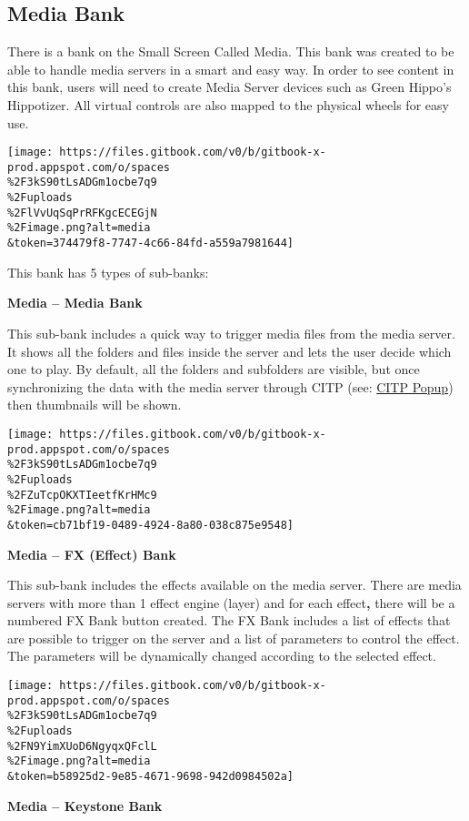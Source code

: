 \documentclass[
]{article}
\begin{document}
\hypertarget{media-bank}{%
\subsection{Media Bank}\label{media-bank}}

There is a bank on the Small Screen Called Media. This bank was created to be able to handle media servers in a smart and easy way. In order to see content in this bank, users will need to create Media Server devices such as Green Hippo's Hippotizer. All virtual controls are also mapped to the physical wheels for easy use.

\texttt{[image: https://files.gitbook.com/v0/b/gitbook-x-prod.appspot.com/o/spaces\\\%2F3kS90tLsADGm1ocbe7q9\\\%2Fuploads\\\%2FlVvUqSqPrRFKgcECEGjN\\\%2Fimage.png?alt=media\\\&token=374479f8-7747-4c66-84fd-a559a7981644]}

This bank has 5 types of sub-banks:

\textbf{Media -- Media Bank}

This sub-bank includes a quick way to trigger media files from the media server. It shows all the folders and files inside the server and lets the user decide which one to play. By default, all the folders and subfolders are visible, but once synchronizing the data with the media server through CITP (see: \href{https://vibemanual.compulite.com/connecting-to-external-devices.html\#citp}{CITP Popup}) then thumbnails will be shown.

\texttt{[image: https://files.gitbook.com/v0/b/gitbook-x-prod.appspot.com/o/spaces\\\%2F3kS90tLsADGm1ocbe7q9\\\%2Fuploads\\\%2FZuTcpOKXTIeetfKrHMc9\\\%2Fimage.png?alt=media\\\&token=cb71bf19-0489-4924-8a80-038c875e9548]}

\textbf{Media -- FX (Effect) Bank}

This sub-bank includes the effects available on the media server. There are media servers with more than 1 effect engine (layer) and for each effect\textbf{,} there will be a numbered FX Bank button created. The FX Bank includes a list of effects that are possible to trigger on the server and a list of parameters to control the effect. The parameters will be dynamically changed according to the selected effect.

\texttt{[image: https://files.gitbook.com/v0/b/gitbook-x-prod.appspot.com/o/spaces\\\%2F3kS90tLsADGm1ocbe7q9\\\%2Fuploads\\\%2FN9YimXUoD6NgyqxQFclL\\\%2Fimage.png?alt=media\\\&token=b58925d2-9e85-4671-9698-942d0984502a]}

\textbf{Media -- Keystone Bank}
\end{document}
